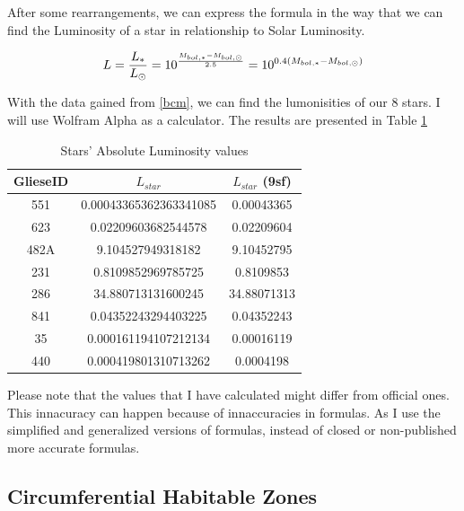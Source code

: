 \documentclass{article}
\begin{document}
After some rearrangements, we can express the formula in the way that we can find the Luminosity of a star in relationship to Solar Luminosity.

\begin{equation}
  L = \frac{L_*}{L_{\odot}} = 10^{\frac{M_{bol, *} - M_{bol, \odot}} {2.5}} = 10^{0.4(M_{bol, *} - M_{bol, \odot})}\\
  \end{equation}

With the data gained from \ref{bcm}, we can find the lumonisities of our 8 stars. I will use Wolfram Alpha as a calculator. The results are presented in Table \ref{lum}\\

\begin{table}[h]
    \begin{center}
      \caption{Stars' Absolute Luminosity values}
      \begin{tabular}{c | c | c}
        \textbf{GlieseID} & \textbf{$L_{star}$} & \textbf{$L_{star}$} (9sf)\\
        \hline
        551  & 0.00043365362363341085 & 0.00043365 \\
        623  & 0.02209603682544578    & 0.02209604 \\
        482A & 9.104527949318182      & 9.10452795 \\
        231  & 0.8109852969785725     & 0.8109853 \\
        286  & 34.880713131600245     & 34.88071313 \\
        841  & 0.04352243294403225    & 0.04352243 \\
        35   & 0.000161194107212134   & 0.00016119 \\
        440  & 0.000419801310713262   & 0.0004198 \\
      \end{tabular}
      \label{lum}
    \end{center}
  \end{table}

Please note that the values that I have calculated might differ from official ones. This innacuracy can happen because of innaccuracies in formulas. As I use the simplified and generalized versions of formulas, instead of closed or non-published more accurate formulas. 

\subsection{Circumferential Habitable Zones}
\end{document}
